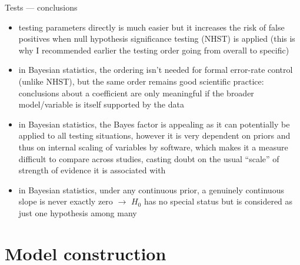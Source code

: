 \documentclass[
  10pt,
  ignorenonframetext,
  aspectratio=169,
  t]{beamer}
\providecommand{\tightlist}{%
  \setlength{\itemsep}{0pt}\setlength{\parskip}{0pt}}
\begin{document}
\begin{frame}{Tests --- conclusions}
\protect{}\label{tests-conclusions}
\begin{itemize}
\tightlist
\item
  testing parameters directly is much easier but it increases the risk
  of false positives when null hypothesis significance testing (NHST) is
  applied (this is why I recommended earlier the testing order going
  from overall to specific)
\end{itemize}

\vspace{1em}

\begin{itemize}
\tightlist
\item
  in Bayesian statistics, the ordering isn't needed for formal
  error-rate control (unlike NHST), but the same order remains good
  scientific practice: conclusions about a coefficient are only
  meaningful if the broader model/variable is itself supported by the
  data
\end{itemize}

\vspace{1em}

\begin{itemize}
\tightlist
\item
  in Bayesian statistics, the Bayes factor is appealing as it can
  potentially be applied to all testing situations, however it is very
  dependent on priors and thus on internal scaling of variables by
  software, which makes it a measure difficult to compare across
  studies, casting doubt on the usual ``scale'' of strength of evidence
  it is associated with
\end{itemize}

\vspace{1em}

\begin{itemize}
\tightlist
\item
  in Bayesian statistics, under any continuous prior, a genuinely
  continuous slope is never exactly zero \(\rightarrow\) \(H_0\) has no
  special status but is considered as just one hypothesis among many
\end{itemize}
\end{frame}

\section{Model construction}\label{model-construction}
\end{document}
